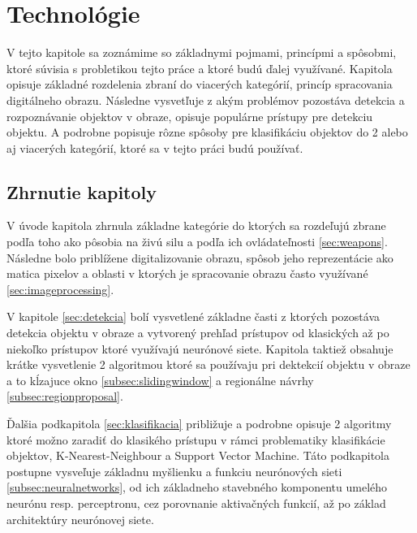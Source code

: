 \chapter{Technológie}   %
\label{chap:technologie}

V tejto kapitole sa zoznámime so základnymi pojmami, princípmi a spôsobmi, ktoré súvisia s probletikou tejto práce a ktoré budú ďalej využívané.
Kapitola opisuje základné rozdelenia zbraní do viacerých kategórií, princíp spracovania digitálneho obrazu.
Následne vysvetľuje z akým problémov pozostáva detekcia a rozpoznávanie objektov v obraze, opisuje populárne prístupy pre detekciu objektu.
A podrobne popisuje rôzne spôsoby pre klasifikáciu objektov do 2 alebo aj viacerých kategórií, ktoré sa v tejto práci budú používať.













\section{Zhrnutie kapitoly}

V úvode kapitola zhrnula základne kategórie do ktorých sa rozdeľujú zbrane podľa toho ako pôsobia na živú silu a podľa ich ovládateľnosti \ref{sec:weapons}.
Následne bolo priblížene digitalizovanie obrazu, spôsob jeho reprezentácie ako matica pixelov a oblasti v ktorých je spracovanie obrazu často využívané \ref{sec:imageprocessing}.

V kapitole \ref{sec:detekcia} bolí vysvetlené základne časti z ktorých pozostáva detekcia objektu v obraze a vytvorený prehľad prístupov od
    klasických až po niekoľko prístupov ktoré využívajú neurónové siete.
Kapitola taktiež obsahuje krátke vysvetlenie 2 algoritmou ktoré sa používaju pri dektekcií objektu v obraze a to kĺzajuce okno \ref{subsec:slidingwindow} a
    regionálne návrhy \ref{subsec:regionproposal}.

Ďalšia podkapitola \ref{sec:klasifikacia} približuje a podrobne opisuje 2 algoritmy ktoré možno zaradiť do klasikého prístupu v rámci problematiky klasifikácie objektov,
    K-Nearest-Neighbour a Support Vector Machine.
Táto podkapitola postupne vysveľuje základnu myšlienku a funkciu neurónových sieti \ref{subsec:neuralnetworks}, od ich základneho stavebného komponentu umelého neurónu resp. perceptronu,
    cez porovnanie aktivačných funkcií, až po základ architektúry neurónovej siete.


